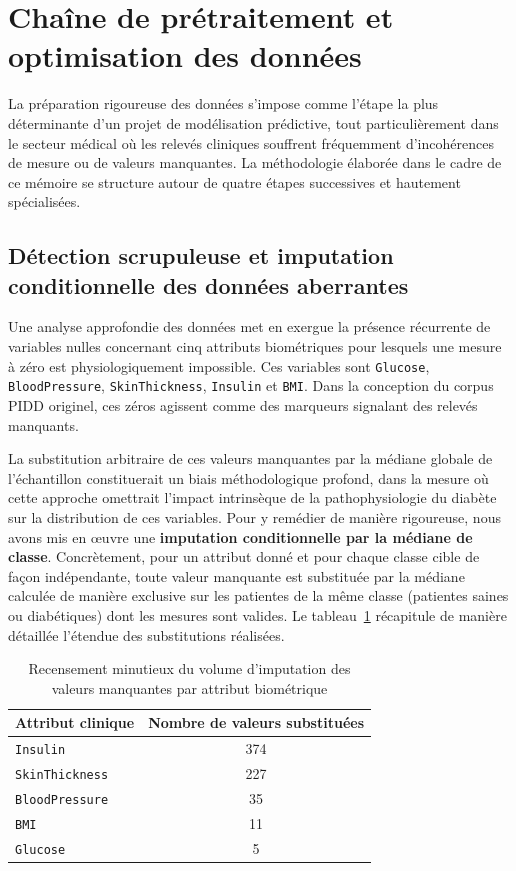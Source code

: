 \section{Chaîne de prétraitement et optimisation des données}

La préparation rigoureuse des données s'impose comme l'étape la plus déterminante d'un projet de modélisation prédictive, tout particulièrement dans le secteur médical où les relevés cliniques souffrent fréquemment d'incohérences de mesure ou de valeurs manquantes. La méthodologie élaborée dans le cadre de ce mémoire se structure autour de quatre étapes successives et hautement spécialisées.

\subsection{Détection scrupuleuse et imputation conditionnelle des données aberrantes}

Une analyse approfondie des données met en exergue la présence récurrente de variables nulles concernant cinq attributs biométriques pour lesquels une mesure à zéro est physiologiquement impossible. Ces variables sont \texttt{Glucose}, \texttt{BloodPressure}, \texttt{SkinThickness}, \texttt{Insulin} et \texttt{BMI}. Dans la conception du corpus PIDD originel, ces zéros agissent comme des marqueurs signalant des relevés manquants.

La substitution arbitraire de ces valeurs manquantes par la médiane globale de l'échantillon constituerait un biais méthodologique profond, dans la mesure où cette approche omettrait l'impact intrinsèque de la pathophysiologie du diabète sur la distribution de ces variables. Pour y remédier de manière rigoureuse, nous avons mis en œuvre une \textbf{imputation conditionnelle par la médiane de classe}. Concrètement, pour un attribut donné et pour chaque classe cible de façon indépendante, toute valeur manquante est substituée par la médiane calculée de manière exclusive sur les patientes de la même classe (patientes saines ou diabétiques) dont les mesures sont valides. Le tableau~\ref{tab:imputation} récapitule de manière détaillée l'étendue des substitutions réalisées.

\begin{table}[htbp]
    \centering
    \caption{Recensement minutieux du volume d'imputation des valeurs manquantes par attribut biométrique}
    \label{tab:imputation}
    \small
    \begin{tabular}{lc}
        \hline
        \textbf{Attribut clinique} & \textbf{Nombre de valeurs substituées} \\
        \hline
        \texttt{Insulin} & 374 \\
        \texttt{SkinThickness} & 227 \\
        \texttt{BloodPressure} & 35 \\
        \texttt{BMI} & 11 \\
        \texttt{Glucose} & 5 \\
        \hline
    \end{tabular}
\end{table}

